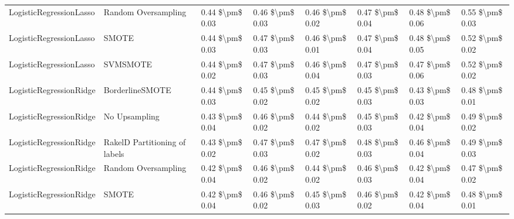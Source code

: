 \begin{tabular}{llllllll}
        LogisticRegressionLasso &           Random Oversampling & 0.44 \$\textbackslash pm\$ 0.03 &           0.46 \$\textbackslash pm\$ 0.03 &       0.46 \$\textbackslash pm\$ 0.02 &        0.47 \$\textbackslash pm\$ 0.04 &                         0.48 \$\textbackslash pm\$ 0.06 &     0.55 \$\textbackslash pm\$ 0.03 \\
        LogisticRegressionLasso &                         SMOTE & 0.44 \$\textbackslash pm\$ 0.03 &           0.47 \$\textbackslash pm\$ 0.03 &       0.46 \$\textbackslash pm\$ 0.01 &        0.47 \$\textbackslash pm\$ 0.04 &                         0.48 \$\textbackslash pm\$ 0.05 &     0.52 \$\textbackslash pm\$ 0.02 \\
        LogisticRegressionLasso &                      SVMSMOTE & 0.44 \$\textbackslash pm\$ 0.02 &           0.47 \$\textbackslash pm\$ 0.03 &       0.46 \$\textbackslash pm\$ 0.04 &        0.47 \$\textbackslash pm\$ 0.03 &                         0.47 \$\textbackslash pm\$ 0.06 &     0.52 \$\textbackslash pm\$ 0.02 \\
        LogisticRegressionRidge &               BorderlineSMOTE & 0.44 \$\textbackslash pm\$ 0.03 &           0.45 \$\textbackslash pm\$ 0.02 &       0.45 \$\textbackslash pm\$ 0.02 &        0.45 \$\textbackslash pm\$ 0.03 &                         0.43 \$\textbackslash pm\$ 0.03 &     0.48 \$\textbackslash pm\$ 0.01 \\
        LogisticRegressionRidge &                 No Upsampling & 0.43 \$\textbackslash pm\$ 0.04 &           0.46 \$\textbackslash pm\$ 0.02 &       0.44 \$\textbackslash pm\$ 0.02 &        0.45 \$\textbackslash pm\$ 0.03 &                         0.42 \$\textbackslash pm\$ 0.04 &     0.49 \$\textbackslash pm\$ 0.02 \\
        LogisticRegressionRidge & RakelD Partitioning of labels & 0.43 \$\textbackslash pm\$ 0.02 &           0.47 \$\textbackslash pm\$ 0.03 &       0.47 \$\textbackslash pm\$ 0.02 &        0.48 \$\textbackslash pm\$ 0.03 &                         0.46 \$\textbackslash pm\$ 0.04 &     0.49 \$\textbackslash pm\$ 0.03 \\
        LogisticRegressionRidge &           Random Oversampling & 0.42 \$\textbackslash pm\$ 0.04 &           0.46 \$\textbackslash pm\$ 0.02 &       0.44 \$\textbackslash pm\$ 0.02 &        0.46 \$\textbackslash pm\$ 0.03 &                         0.42 \$\textbackslash pm\$ 0.04 &     0.47 \$\textbackslash pm\$ 0.02 \\
        LogisticRegressionRidge &                         SMOTE & 0.42 \$\textbackslash pm\$ 0.04 &           0.46 \$\textbackslash pm\$ 0.02 &       0.45 \$\textbackslash pm\$ 0.03 &        0.46 \$\textbackslash pm\$ 0.02 &                         0.42 \$\textbackslash pm\$ 0.04 &     0.48 \$\textbackslash pm\$ 0.01 \\

\end{tabular}

